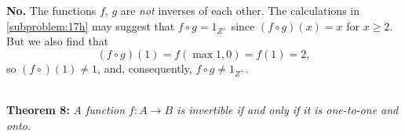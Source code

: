 \documentclass[a4paper, english, 12pt]{article} %
\begin{document}
\begin{answer}
  \textbf{No.} The functions $f$, $g$ are \emph{not} inverses of each other. The
  calculations in \cref{subproblem:17h} may suggest that $f \circ g = 1_{Z^+}$
  since $(f \circ g)(x) = x$ for $x \geq 2$. But we also find that
  \begin{equation*}
    (f \circ g)(1) = f(\max{1, 0}) = f(1) = 2,
  \end{equation*}
  so $(f \circ)(1) \neq 1$, and, consequently, $f \circ g \neq 1_{Z^+}$.
\end{answer}

\noindent
\\\textbf{\hypertarget{thm:8}{Theorem 8:}} \textit{A function $f \colon A \to B$ is invertible if and only if it is
  one-to-one and onto.}
\end{document}
